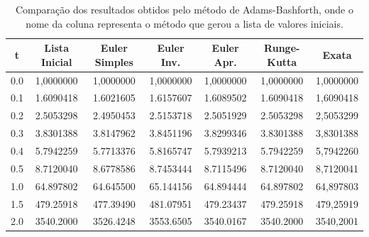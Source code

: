 \documentclass{article}
\begin{document}
\begin{otherlanguage}{brazil}
    \begin{table}[!htbp]
    \centering
     \begin{tabular}{||c c c c c c c||}
     \hline
     t & Lista Inicial & Euler Simples & Euler Inv. & Euler Apr. & Runge-Kutta & Exata \\ [0.5ex] 
     \hline\hline
     0.0 & 1,0000000 & 1,0000000 & 1,0000000 & 1,0000000 & 1,0000000 & 1,0000000 \\
     0.1 & 1.6090418 & 1.6021605 & 1.6157607 & 1.6089502 & 1.6090418 & 1,6090418 \\ 
     0.2 & 2.5053298 & 2.4950453 & 2.5153718 & 2.5051929 & 2.5053298 & 2,5053299 \\
     0.3 & 3.8301388 & 3.8147962 & 3.8451196 & 3.8299346 & 3.8301388 & 3,8301388 \\
     0.4 & 5.7942259 & 5.7713376 & 5.8165747 & 5.7939213 & 5.7942259 & 5,7942260 \\
     0.5 & 8.7120040 & 8.6778586 & 8.7453444 & 8.7115496 & 8.7120040 & 8,7120041 \\
     1.0 & 64.897802 & 64.645500 & 65.144156 & 64.894444 & 64.897802 & 64,897803 \\
     1.5 & 479.25918 & 477.39490 & 481.07951 & 479.23437 & 479.25918 & 479,25919 \\
     2.0 & 3540.2000 & 3526.4248 & 3553.6505 & 3540.0167 & 3540.2000 & 3540,2001 \\ [1ex]
     \hline
     \end{tabular}
     \caption{Comparação dos resultados obtidos pelo método de Adams-Bashforth, onde o nome da coluna representa o método que gerou a lista de valores iniciais.}
     \label{table:2}
    \end{table}
    

\end{otherlanguage}
\end{document}
